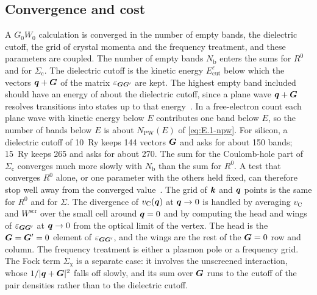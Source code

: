 \subsection{Convergence and cost}

A $G_0W_0$ calculation is converged in the number of empty bands, the dielectric cutoff, the grid of crystal momenta and the frequency treatment, and these parameters are coupled. The number of empty bands $N_{\mathrm{b}}$ enters the sums for $R^0$ and for $\Sigma_{\mathrm{c}}$. The dielectric cutoff is the kinetic energy $E^{\varepsilon}_{\mathrm{cut}}$ below which the vectors $\bm{q} + \bm{G}$ of the matrix $\varepsilon_{\bm{G}\bm{G}'}$ are kept. The highest empty band included should have an energy of about the dielectric cutoff, since a plane wave $\bm{q} + \bm{G}$ resolves transitions into states up to that energy~\cite[Sect.~4]{deslippe2012berkeleygw}. In a free-electron count each plane wave with kinetic energy below $E$ contributes one band below $E$, so the number of bands below $E$ is about $N_{\mathrm{PW}}(E)$ of \cref{eq:E.1-npw}. For silicon, a dielectric cutoff of \SI{10}{Ry} keeps 144 vectors $\bm{G}$ and asks for about 150 bands; \SI{15}{Ry} keeps 265 and asks for about 270. The sum for the Coulomb-hole part of $\Sigma_{\mathrm{c}}$ converges much more slowly with $N_{\mathrm{b}}$ than the sum for $R^0$. A test that converges $R^0$ alone, or one parameter with the others held fixed, can therefore stop well away from the converged value~\cite[Sect.~4 and Fig.~8]{deslippe2012berkeleygw}. The grid of $\bm{k}$ and $\bm{q}$ points is the same for $R^0$ and for $\Sigma$. The divergence of $v_{\mathrm{C}}(\bm{q})$ at $\bm{q} \to 0$ is handled by averaging $v_{\mathrm{C}}$ and $W^{\mathrm{scr}}$ over the small cell around $\bm{q} = 0$ and by computing the head and wings of $\varepsilon_{\bm{G}\bm{G}'}$ at $\bm{q} \to 0$ from the optical limit of the vertex. The head is the $\bm{G} = \bm{G}' = 0$ element of $\varepsilon_{\bm{G}\bm{G}'}$, and the wings are the rest of the $\bm{G} = 0$ row and column. The frequency treatment is either a plasmon pole or a frequency grid. The Fock term $\Sigma_{\mathrm{x}}$ is a separate case: it involves the unscreened interaction, whose $1/|\bm{q} + \bm{G}|^2$ falls off slowly, and its sum over $\bm{G}$ runs to the cutoff of the pair densities rather than to the dielectric cutoff.

